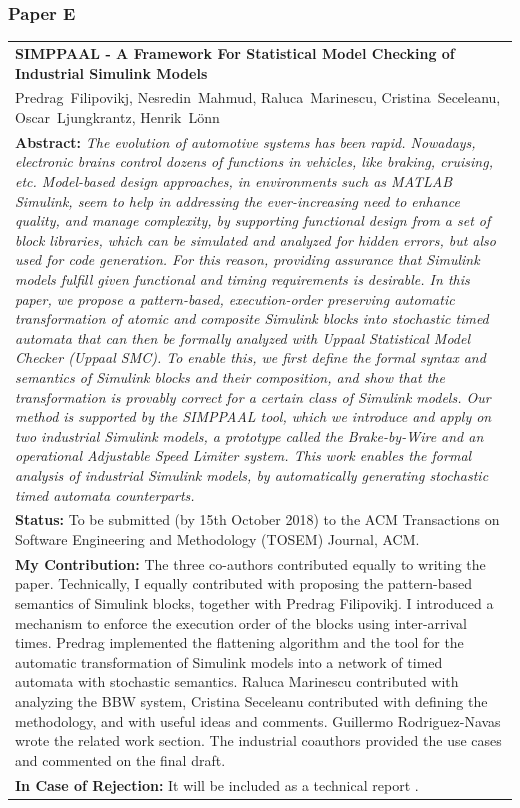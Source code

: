 \subsubsection{Paper E}
\begin{tabular}{p{\textwidth}}
\textbf{SIMPPAAL - A Framework For Statistical Model Checking of Industrial Simulink Models}\\%
Predrag~Filipovikj, Nesredin~Mahmud, Raluca~Marinescu, Cristina~Seceleanu, Oscar~Ljungkrantz, Henrik~L\"{o}nn
\\[6pt]%
\noindent \textbf{Abstract:} \textit{The evolution of automotive systems has been rapid. Nowadays, electronic brains control dozens of functions in vehicles, like
braking, cruising, etc. Model-based design approaches, in environments such as MATLAB Simulink, seem to help in addressing
the ever-increasing need to enhance quality, and manage complexity, by supporting functional design from a set of block
libraries, which can be simulated and analyzed for hidden errors, but also used for code generation. For this reason, providing
assurance that Simulink models fulfill given functional and timing requirements is desirable. In this paper, we propose a
pattern-based, execution-order preserving automatic transformation of atomic and composite Simulink blocks into stochastic
timed automata that can then be formally analyzed with Uppaal Statistical Model Checker (Uppaal SMC). To enable this, we
first define the formal syntax and semantics of Simulink blocks and their composition, and show that the transformation is
provably correct for a certain class of Simulink models. Our method is supported by the SIMPPAAL tool, which we introduce
and apply on two industrial Simulink models, a prototype called the Brake-by-Wire and an operational Adjustable Speed
Limiter system. This work enables the formal analysis of industrial Simulink models, by automatically generating stochastic
timed automata counterparts.}
\\[6pt]%
\noindent \textbf{Status:} To be submitted (by 15th October 2018)  to the ACM Transactions on Software Engineering and Methodology (TOSEM) Journal, ACM. 
\\%
\textbf{My Contribution: } The three co-authors contributed equally to writing the paper. Technically, I equally contributed with proposing the pattern-based semantics of Simulink blocks, together with Predrag Filipovikj. I introduced a mechanism to enforce the execution order of the blocks using inter-arrival times. Predrag implemented the flattening algorithm and the tool for the automatic transformation of Simulink models into a network of timed automata with stochastic semantics. Raluca Marinescu contributed with analyzing the BBW system, Cristina Seceleanu contributed with defining the methodology, and with useful ideas and comments. Guillermo Rodriguez-Navas wrote the related work section. The industrial coauthors provided the use cases and commented on the final draft.\\%
\textbf{In Case of Rejection: } It will be included as a technical report \cite{Filipovikj4714}. \\
\end{tabular}

